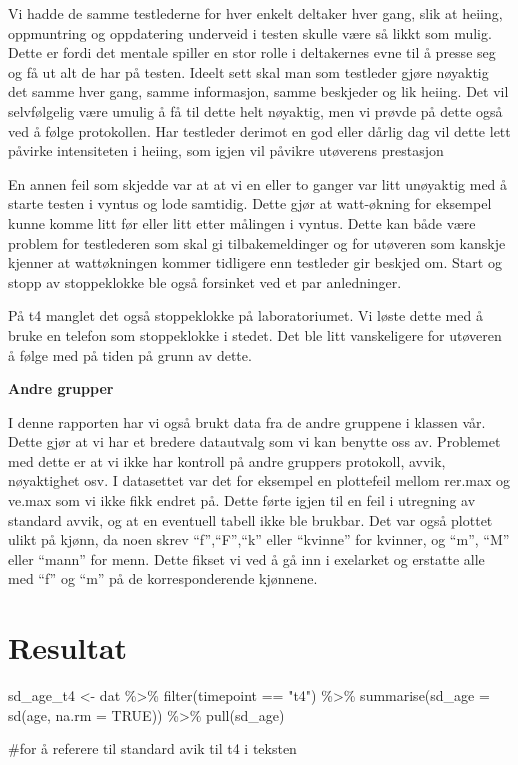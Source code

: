 \documentclass[
  letterpaper,
  DIV=11,
  numbers=noendperiod]{scrreprt}
\newenvironment{Shaded}{\begin{snugshade}}{\end{snugshade}}
\newcommand{\AttributeTok}[1]{\textcolor[rgb]{0.40,0.45,0.13}{#1}}
\newcommand{\CommentTok}[1]{\textcolor[rgb]{0.37,0.37,0.37}{#1}}
\newcommand{\ConstantTok}[1]{\textcolor[rgb]{0.56,0.35,0.01}{#1}}
\newcommand{\FunctionTok}[1]{\textcolor[rgb]{0.28,0.35,0.67}{#1}}
\newcommand{\NormalTok}[1]{\textcolor[rgb]{0.00,0.23,0.31}{#1}}
\newcommand{\OtherTok}[1]{\textcolor[rgb]{0.00,0.23,0.31}{#1}}
\newcommand{\SpecialCharTok}[1]{\textcolor[rgb]{0.37,0.37,0.37}{#1}}
\newcommand{\StringTok}[1]{\textcolor[rgb]{0.13,0.47,0.30}{#1}}
\begin{document}
Vi hadde de samme testlederne for hver enkelt deltaker hver gang, slik
at heiing, oppmuntring og oppdatering underveid i testen skulle være så
likkt som mulig. Dette er fordi det mentale spiller en stor rolle i
deltakernes evne til å presse seg og få ut alt de har på testen. Ideelt
sett skal man som testleder gjøre nøyaktig det samme hver gang, samme
informasjon, samme beskjeder og lik heiing. Det vil selvfølgelig være
umulig å få til dette helt nøyaktig, men vi prøvde på dette også ved å
følge protokollen. Har testleder derimot en god eller dårlig dag vil
dette lett påvirke intensiteten i heiing, som igjen vil påvikre
utøverens prestasjon

En annen feil som skjedde var at at vi en eller to ganger var litt
unøyaktig med å starte testen i vyntus og lode samtidig. Dette gjør at
watt-økning for eksempel kunne komme litt før eller litt etter målingen
i vyntus. Dette kan både være problem for testlederen som skal gi
tilbakemeldinger og for utøveren som kanskje kjenner at wattøkningen
kommer tidligere enn testleder gir beskjed om. Start og stopp av
stoppeklokke ble også forsinket ved et par anledninger.

På t4 manglet det også stoppeklokke på laboratoriumet. Vi løste dette
med å bruke en telefon som stoppeklokke i stedet. Det ble litt
vanskeligere for utøveren å følge med på tiden på grunn av dette.

\textbf{Andre grupper}

I denne rapporten har vi også brukt data fra de andre gruppene i klassen
vår. Dette gjør at vi har et bredere datautvalg som vi kan benytte oss
av. Problemet med dette er at vi ikke har kontroll på andre gruppers
protokoll, avvik, nøyaktighet osv. I datasettet var det for eksempel en
plottefeil mellom rer.max og ve.max som vi ikke fikk endret på. Dette
førte igjen til en feil i utregning av standard avvik, og at en
eventuell tabell ikke ble brukbar. Det var også plottet ulikt på kjønn,
da noen skrev ``f'',``F'',``k'' eller ``kvinne'' for kvinner, og ``m'',
``M'' eller ``mann'' for menn. Dette fikset vi ved å gå inn i exelarket
og erstatte alle med ``f'' og ``m'' på de korresponderende kjønnene.


\chapter{Resultat}\label{resultat}

\begin{Shaded}
\begin{Highlighting}[]
\NormalTok{sd\_age\_t4 }\OtherTok{\textless{}{-}}\NormalTok{ dat }\SpecialCharTok{\%\textgreater{}\%}
  \FunctionTok{filter}\NormalTok{(timepoint }\SpecialCharTok{==} \StringTok{"t4"}\NormalTok{) }\SpecialCharTok{\%\textgreater{}\%}
  \FunctionTok{summarise}\NormalTok{(}\AttributeTok{sd\_age =} \FunctionTok{sd}\NormalTok{(age, }\AttributeTok{na.rm =} \ConstantTok{TRUE}\NormalTok{)) }\SpecialCharTok{\%\textgreater{}\%}
  \FunctionTok{pull}\NormalTok{(sd\_age)}

\CommentTok{\#for å referere til standard avik til t4 i teksten}
\end{Highlighting}
\end{Shaded}
\end{document}
